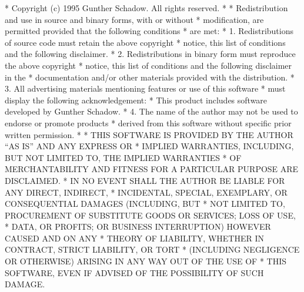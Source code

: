 \begin{copyrightEnv}
 * Copyright (c) 1995 Gunther Schadow.  All rights reserved.
 *
 * Redistribution and use in source and binary forms, with or without
 * modification, are permitted provided that the following conditions
 * are met:
 * 1. Redistributions of source code must retain the above copyright
 *    notice, this list of conditions and the following disclaimer.
 * 2. Redistributions in binary form must reproduce the above copyright
 *    notice, this list of conditions and the following disclaimer in the
 *    documentation and/or other materials provided with the distribution.
 * 3. All advertising materials mentioning features or use of this software
 *    must display the following acknowledgement:
 *      This product includes software developed by Gunther Schadow.
 * 4. The name of the author may not be used to endorse or promote products
 *    derived from this software without specific prior written permission.
 *
 * THIS SOFTWARE IS PROVIDED BY THE AUTHOR ``AS IS'' AND ANY EXPRESS OR
 * IMPLIED WARRANTIES, INCLUDING, BUT NOT LIMITED TO, THE IMPLIED WARRANTIES
 * OF MERCHANTABILITY AND FITNESS FOR A PARTICULAR PURPOSE ARE DISCLAIMED.
 * IN NO EVENT SHALL THE AUTHOR BE LIABLE FOR ANY DIRECT, INDIRECT,
 * INCIDENTAL, SPECIAL, EXEMPLARY, OR CONSEQUENTIAL DAMAGES (INCLUDING, BUT
 * NOT LIMITED TO, PROCUREMENT OF SUBSTITUTE GOODS OR SERVICES; LOSS OF USE,
 * DATA, OR PROFITS; OR BUSINESS INTERRUPTION) HOWEVER CAUSED AND ON ANY
 * THEORY OF LIABILITY, WHETHER IN CONTRACT, STRICT LIABILITY, OR TORT
 * (INCLUDING NEGLIGENCE OR OTHERWISE) ARISING IN ANY WAY OUT OF THE USE OF
 * THIS SOFTWARE, EVEN IF ADVISED OF THE POSSIBILITY OF SUCH DAMAGE.
\end{copyrightEnv}

